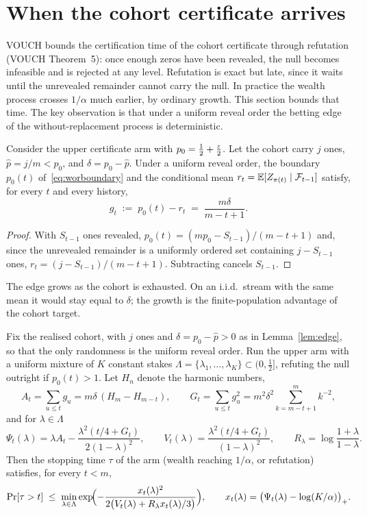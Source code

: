 \section{When the cohort certificate arrives}\label{sec:time}

VOUCH bounds the certification time of the cohort certificate through refutation
(VOUCH Theorem~5): once enough zeros have been revealed, the null becomes infeasible and
is rejected at any level. Refutation is exact but late, since it waits until the
unrevealed remainder cannot carry the null. In practice the wealth process crosses
$1/\alpha$ much earlier, by ordinary growth. This section bounds that time. The key
observation is that under a uniform reveal order the betting edge of the
without-replacement process is deterministic.

\begin{lemma}\label{lem:edge}
Consider the upper certificate arm with $p_0=\frac12+\frac{\varepsilon}2$. Let the cohort carry
$j$ ones, $\hat p=j/m<p_0$, and $\delta=p_0-\hat p$. Under a uniform reveal order, the
boundary $p_0(t)$ of~\eqref{eq:worboundary} and the conditional mean
$r_t=\mathbb{E}[Z_{\pi(t)}\mid\mathcal{F}_{t-1}]$ satisfy, for every $t$ and every history,
\[
g_t \;:=\; p_0(t)-r_t \;=\; \frac{m\delta}{m-t+1}.
\]
\end{lemma}

\begin{proof}
With $S_{t-1}$ ones revealed, $p_0(t)=(mp_0-S_{t-1})/(m-t+1)$ and, since the unrevealed
remainder is a uniformly ordered set containing $j-S_{t-1}$ ones,
$r_t=(j-S_{t-1})/(m-t+1)$. Subtracting cancels $S_{t-1}$.
\end{proof}

The edge grows as the cohort is exhausted. On an i.i.d.\ stream with the same mean it
would stay equal to $\delta$; the growth is the finite-population advantage of the
cohort target.

\begin{theorem}\label{thm:growth}
Fix the realised cohort, with $j$ ones and $\delta=p_0-\hat p>0$ as in
Lemma~\ref{lem:edge}, so that the only randomness is the uniform reveal order. Run the
upper arm with a uniform mixture of $K$ constant stakes
$\Lambda=\{\lambda_1,\dots,\lambda_K\}\subset(0,\frac12]$, refuting the null outright if
$p_0(t)>1$. Let $H_n$ denote the harmonic numbers,
\[
A_t=\sum_{u\le t}g_u=m\delta\,(H_m-H_{m-t}),\qquad
G_t=\sum_{u\le t}g_u^2=m^2\delta^2\!\!\sum_{k=m-t+1}^{m}\!k^{-2},
\]
and for $\lambda\in\Lambda$
\[
\Psi_t(\lambda)=\lambda A_t-\frac{\lambda^2(t/4+G_t)}{2(1-\lambda)^2},\qquad
V_t(\lambda)=\frac{\lambda^2(t/4+G_t)}{(1-\lambda)^2},\qquad
R_\lambda=\log\frac{1+\lambda}{1-\lambda}.
\]
Then the stopping time $\tau$ of the arm (wealth reaching $1/\alpha$, or refutation)
satisfies, for every $t<m$,
\[
\Pr[\tau>t]\;\le\;\min_{\lambda\in\Lambda}
\exp\!\Bigl(-\frac{x_t(\lambda)^2}{2\bigl(V_t(\lambda)+R_\lambda x_t(\lambda)/3\bigr)}\Bigr),
\qquad x_t(\lambda)=\bigl(\Psi_t(\lambda)-\log(K/\alpha)\bigr)_+ .
\]
\end{theorem}

